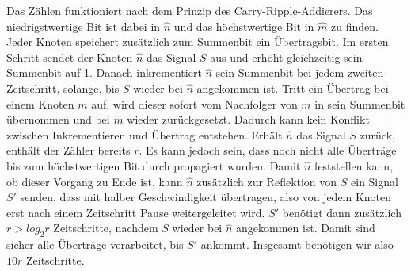 \documentclass[11pt]{article}
\begin{document}
Das Zählen funktioniert nach dem Prinzip des Carry-Ripple-Addierers. 
Das niedrigstwertige Bit ist dabei in $\hat{n}$ und das höchstwertige Bit in $\hat{m}$ zu finden.
Jeder Knoten speichert zusätzlich zum Summenbit ein Übertragsbit. Im ersten Schritt sendet der Knoten $\hat{n}$ das Signal $S$ aus und erhöht gleichzeitig sein Summenbit auf 1. Danach inkrementiert $\hat{n}$ sein Summenbit bei jedem zweiten Zeitschritt, solange, bis $S$ wieder bei $\hat{n}$ angekommen ist. 
Tritt ein Übertrag bei einem Knoten $m$ auf, wird dieser sofort vom Nachfolger von $m$ in sein Summenbit übernommen und bei $m$ wieder zurückgesetzt.
Dadurch kann kein Konflikt zwischen Inkrementieren und Übertrag entstehen.
Erhält $\hat{n}$ das Signal $S$ zurück, enthält der Zähler bereits $r$. 
Es kann jedoch sein, dass noch nicht alle Überträge bis zum höchstwertigen Bit durch propagiert wurden. 
Damit $\hat{n}$ feststellen kann, ob dieser Vorgang zu Ende ist, kann $\hat{n}$ zusätzlich zur Reflektion von $S$ ein Signal $S'$ senden, dass mit halber Geschwindigkeit übertragen, also von jedem Knoten erst nach einem Zeitschritt Pause weitergeleitet wird.
$S'$ benötigt dann zusätzlich $r > log_2 r$ Zeitschritte, nachdem $S$ wieder bei $\hat{n}$ angekommen ist. 
Damit sind sicher alle Überträge verarbeitet, bis $S'$ ankommt.
Insgesamt benötigen wir also $10r$ Zeitschritte.
\end{document}
